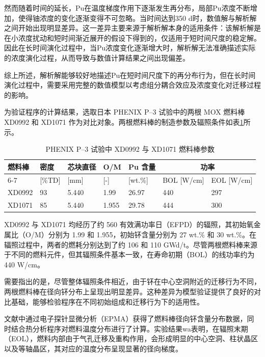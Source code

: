 然而随着时间的延长，Pu在温度梯度作用下逐渐发生再分布，局部Pu浓度不断增加，使得铀浓度的变化逐渐变得不可忽略。当时间达到350 d时，数值解与解析解之间开始出现明显差异。这一差异主要来源于解析解本身的适用条件：该解析解是在小浓度扰动和短时间渐近展开的假设下得到的，仅适用于短时间尺度的稳定解。因此在长时间演化过程中，当Pu浓度变化逐渐增大时，解析解无法准确描述实际的浓度演化过程，从而导致与数值计算结果之间出现偏差。

综上所述，解析解能够较好地描述Pu在短时间尺度下的再分布行为，但在长时间演化过程中，需要采用完整的数值模型以考虑组分耦合效应及浓度变化对迁移过程的影响。

为验证程序的计算结果，选取日本 PHENIX P--3 试验中的两根 MOX 燃料棒 XD0992 和 XD1071 作为对比对象\cite{zotero-item-2022}。两根燃料棒的制造参数及辐照条件如表\ref{tab:pu_experiment}所示。

\begin{table}[htbp]
	\centering
	\caption{PHENIX P--3 试验中 XD0992 与 XD1071 燃料棒参数}
	\label{tab:pu_experiment}
	\begin{tabularx}{\textwidth}{X X X X X X X}
		\toprule
		燃料棒 & 密度 & 芯块直径 & O/M & Pu 含量 & \multicolumn{2}{c}{功率} \\
		\cmidrule(lr){6-7}
		& [\%TD] & [mm] & [-] & [wt.\%] & BOL [W/cm] & EOL [W/cm] \\
		\midrule
		XD0992 & 93 & 5.440 & 1.99  & 26.97 & 440 & 297 \\
		XD1071 & 85 & 5.440 & 1.955 & 29.78 & 444 & 300 \\
		\bottomrule
	\end{tabularx}
\end{table}

XD0992 与 XD1071 均经历了约 560 有效满功率日（EFPD）的辐照，其初始氧金属比（O/M）分别为 1.99 和 1.955，初始钚含量分别为 27 wt.\% 和 30 wt.\%。在辐照过程中，两者的燃耗分别达到了约 106 和 110 GWd/t。尽管两根燃料棒来源于不同的燃料元件，但其辐照条件基本一致，在寿命初期（BOL）的线功率约为 440 W/cm。

需要指出的是，尽管整体辐照条件相近，由于钚在中心空洞附近的迁移行为不同，两根燃料棒在径向钚分布上呈现出明显差异。这种差异为模型验证提供了良好的对比基础，能够检验程序在不同初始组成和迁移行为下的适用性。

文献\cite{zotero-item-2022,ishiiInvestigationPuMigration2001}中通过电子探针显微分析（EPMA）获得了燃料棒径向钚含量分布数据，同时结合热分析程序对燃料温度分布进行了计算。实验结果wa表明，在辐照末期（EOL），燃料内部由于气孔迁移及重构作用，会形成明显的中心空洞、柱状晶区以及等轴晶区，其对应的温度分布呈现显著的径向梯度。

